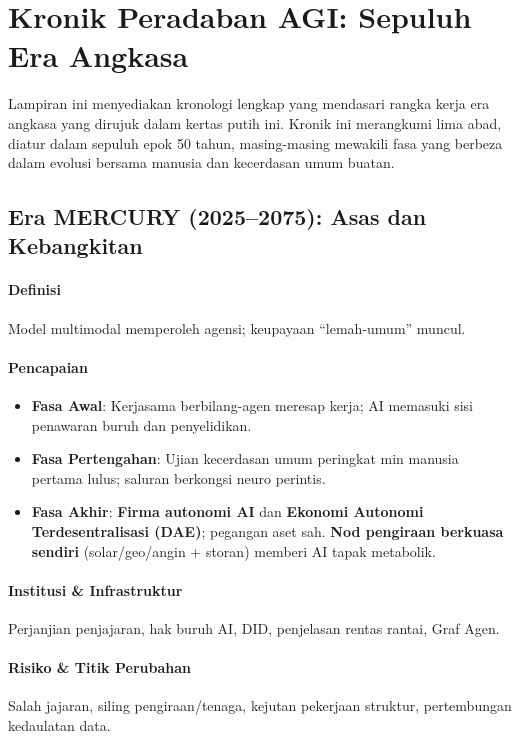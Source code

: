 \documentclass[11pt]{article}
\begin{document}
\appendix
\newpage

\section{Kronik Peradaban AGI: Sepuluh Era Angkasa}
\label{appendix:chronicle}

Lampiran ini menyediakan kronologi lengkap yang mendasari rangka kerja era angkasa yang dirujuk dalam kertas putih ini. Kronik ini merangkumi lima abad, diatur dalam sepuluh epok 50 tahun, masing-masing mewakili fasa yang berbeza dalam evolusi bersama manusia dan kecerdasan umum buatan.

\subsection{Era MERCURY (2025–2075): Asas dan Kebangkitan}
\paragraph{Definisi} Model multimodal memperoleh agensi; keupayaan ``lemah-umum'' muncul.

\paragraph{Pencapaian}
\begin{itemize}[noitemsep]
  \item \textbf{Fasa Awal}: Kerjasama berbilang-agen meresap kerja; AI memasuki sisi penawaran buruh dan penyelidikan.
  \item \textbf{Fasa Pertengahan}: Ujian kecerdasan umum peringkat min manusia pertama lulus; saluran berkongsi neuro perintis.
  \item \textbf{Fasa Akhir}: \textbf{Firma autonomi AI} dan \textbf{Ekonomi Autonomi Terdesentralisasi (DAE)}; pegangan aset sah. \textbf{Nod pengiraan berkuasa sendiri} (solar/geo/angin + storan) memberi AI tapak metabolik.
\end{itemize}

\paragraph{Institusi \& Infrastruktur} Perjanjian penjajaran, hak buruh AI, DID, penjelasan rentas rantai, Graf Agen.

\paragraph{Risiko \& Titik Perubahan} Salah jajaran, siling pengiraan/tenaga, kejutan pekerjaan struktur, pertembungan kedaulatan data.
\end{document}
